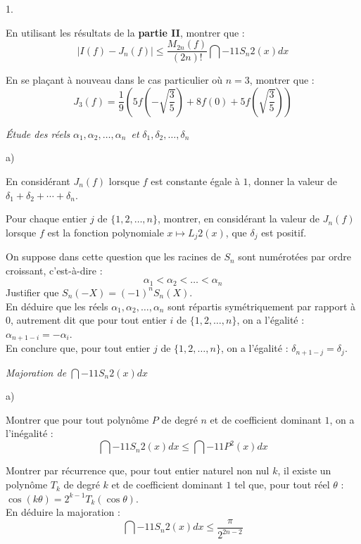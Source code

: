 \documentclass[11pt]{article}%
\begin{document}
\begin{noliste}{1.}
\item En utilisant les résultats de la \textbf{partie II}, montrer que
: 
\[
\left| I(f)-J_{n}(f)\right| \leq
\dfrac{M_{2n}(f)}{(2n)!}\dint{-1}{1}S_{n}{2}(x)dx
\]

\item En se plaçant à nouveau dans le cas particulier où $n = 3$,
montrer que : 
\[
J_{3}(f) = \dfrac{1}{9}\left( 5f(-\sqrt{\dfrac{3}{5}}) + 8f(0) +
5f(\sqrt{\dfrac{3}{5}})\right)
\]

\item \textit{Étude des réels
}$\alpha_{1},\alpha_{2},\dots,\alpha_{n}$\textit{\ et
}$\delta_{1},\delta_{2},\dots,\delta_{n}$\textit{\ }

\begin{noliste}{a)}
 \setlength{\itemsep}{2mm}
\item En considérant $J_{n}(f)$ lorsque $f$ est constante égale à $1$,
donner la valeur de $\delta_{1} + \delta_{2} + \cdots + \delta_{n}$.

\item Pour chaque entier $j$ de $\{1,2,\dots,n\}$, montrer, en
considérant
la valeur de $J_{n}(f)$ lorsque $f$ est la fonction polynomiale
$x\mapsto
L_{j}{2}(x)$, que $\delta_{j}$ est positif.

\item On suppose dans cette question que les racines de $S_{n}$ sont
numérotées par ordre croissant, c'est-à-dire : 
\[
\alpha_{1}<\alpha_{2}<\dots <\alpha_{n}
\]
Justifier que $S_{n}(-X) = (-1)^{n}S_{n}(X)$.\\
En déduire que les réels $\alpha_{1},\alpha_{2},\dots,\alpha_{n}$ sont
répartis symétriquement par rapport à $0$, autrement dit que pour tout
entier $i$ de $\{1,2,\dots,n\}$, on a l'égalité : $\alpha_{n + 1-i} =
-\alpha_{i}$.\\
En conclure que, pour tout entier $j$ de $\{1,2,\dots,n\}$, on a
l'égalité : $\delta_{n + 1-j} = \delta_{j}$.
\end{noliste}

\item \textit{Majoration de }$\dint{-1}{1}S_{n}{2}(x)dx$\textit{\ }

\begin{noliste}{a)}
 \setlength{\itemsep}{2mm}
\item Montrer que pour tout polynôme $P$ de degré $n$ et de coefficient
dominant $1$, on a l'inégalité : 
\[
\dint{-1}{1}S_{n}{2}(x)dx\leq \dint{-1}{1}P^{2}(x)dx
\]

\item Montrer par récurrence que, pour tout entier naturel non nul $k$,
il
existe un polynôme $T_{k}$ de degré $k$ et de coefficient dominant $1$
tel
que, pour tout réel $\theta $ :\quad $\cos (k\theta ) =
2^{k-1}T_{k}(\cos
\theta )$.\\
En déduire la majoration : 
\[
\dint{-1}{1}S_{n}{2}(x)dx\leq \dfrac{\pi }{2^{2n-2}}
\]
\end{noliste}
\end{noliste}

\label{fin}
\end{document}
